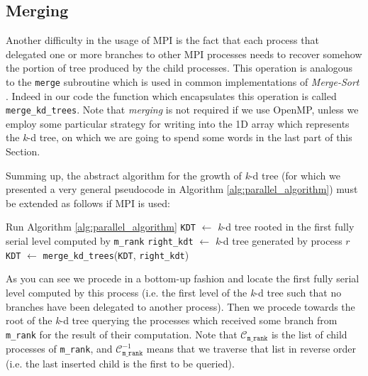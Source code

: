 \documentclass{article}
\newcommand{\kdtree}{\emph{k}-d tree}
\begin{document}
\subsection{Merging}
Another difficulty in the usage of MPI is the fact that each process that
delegated one or more branches to other MPI processes needs to recover somehow
the portion of tree produced by the child processes. This operation is analogous
to the \texttt{merge} subroutine which is used in common implementations of
\emph{Merge-Sort} \cite{cormen2009introduction}. Indeed in our code the function
which encapsulates this operation is called \texttt{merge\_kd\_trees}. Note that
\emph{merging} is not required if we use OpenMP, unless we employ some
particular strategy for writing into the 1D array which represents the
\kdtree{}, on which we are going to spend some words in the last part of this
Section.

Summing up, the abstract algorithm for the growth of \kdtree{} (for which we
presented a very general pseudocode in Algorithm \ref{alg:parallel_algorithm})
must be extended as follows if MPI is used:

\begin{algorithm}[H]
    \SetAlgoLined
    \caption{Parallel \kdtree{} growth (MPI)}\label{alg:parallel_algorithm_mpi}
    Run Algorithm \ref*{alg:parallel_algorithm}\;
    \texttt{KDT} $\gets$ \kdtree{} rooted in the first fully serial level computed by \texttt{m\_rank}\;
        {
            \texttt{right\_kdt} $\gets$ \kdtree{} generated by process $r$\;
            \texttt{KDT} $\gets$ \texttt{merge\_kd\_trees}(\texttt{KDT}, \texttt{right\_kdt})\;
        }
\end{algorithm}

As you can see we procede in a bottom-up fashion and locate the first fully
serial level computed by this process (i.e. the first level of the \kdtree{}
such that no branches have been delegated to another process). Then we procede
towards the root of the \kdtree{} querying the processes which received some
branch from \texttt{m\_rank} for the result of their computation. Note that
$\mathcal{C}_{\texttt{m\_rank}}$ is the list of child processes of
\texttt{m\_rank}, and $\mathcal{C}_{\texttt{m\_rank}}^{-1}$ means that we
traverse that list in reverse order (i.e. the last inserted child is the first
to be queried).
\end{document}

